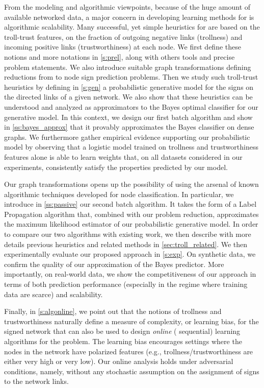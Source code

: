 From the modeling and algorithmic viewpoints, because of the huge amount of available networked
data, a major concern in developing learning methods for \esp{} is algorithmic
scalability. Many successful, yet simple heuristics for \esp{} are based on the
troll-trust features, \ie{} on the fraction of outgoing negative links (trollness) and incoming
positive links (trustworthiness) at each node. We first define these notions and more notations in
\autoref{s:prel}, along with others tools and precise problem statements.
We also introduce suitable graph transformations defining reductions from \esp{} to
node sign prediction problems.
Then we study such
troll-trust heuristics by defining in \autoref{s:gen} a probabilistic
generative model for the signs on the directed links of a given network. We also show that these
heuristics can be understood and analyzed as approximators to the Bayes optimal classifier for our
generative model. In this context, we design our first batch algorithm and show in
\autoref{ss:bayes_approx} that it provably approximates the Bayes classifier on dense graphs.
We furthermore gather empirical evidence supporting our probabilistic model by observing
that a logistic model trained on trollness and trustworthiness features alone is able to learn
weights that, on all datasets considered in our experiments, consistently satisfy the properties
predicted by our model.

Our graph transformations opens up the possibility of using the arsenal of known
algorithmic techniques developed for node classification. In particular, we introduce in
\autoref{ss:passive} our second batch algorithm. It takes the form of a Label
Propagation algorithm that, combined with our problem reduction, approximates the maximum likelihood
estimator of our probabilistic generative model.
In order to compare our two algorithms with existing work, we then describe with more details
previous heuristics and related methods in \autoref{sec:troll_related}.
We then experimentally evaluate our proposed approach in \autoref{s:exp}. On synthetic data, we
confirm the quality of our approximation of the Bayes predictor. More importantly, on real-world
data, we show the competitiveness of our approach in terms of both prediction performance
(especially in the regime where training data are scarce) and scalability.

Finally, in \autoref{s:algonline}, we point out that the notions of trollness and trustworthiness
naturally define a measure
of complexity, or learning bias, for the signed network that can also be used to design
\emph{online} (\ie{} sequential) learning algorithms for the \esp{} problem. The
learning bias encourages settings where the nodes in the network have polarized features (e.g.,
trollness/trustworthiness are either very high or very low). Our online analysis holds under
adversarial conditions, namely, without any stochastic assumption on the assignment of signs to the
network links.
